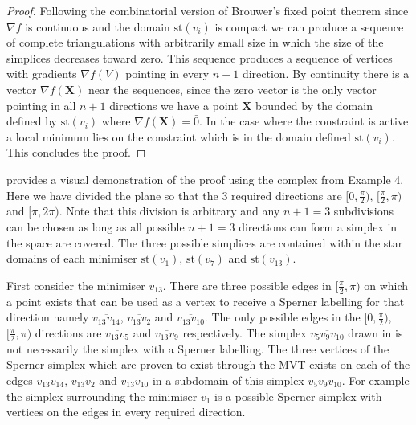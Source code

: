 \begin{proof}
Following the combinatorial version of Brouwer's fixed point theorem \citep{Henle1979} since $\nabla f$ is continuous and the domain $\textrm{st}\left( v_i \right)$ is compact we can produce a sequence of complete triangulations with arbitrarily small size in which the size of the simplices decreases toward zero. This sequence produces a sequence of vertices with gradients $\nabla f(V)$ pointing in every $n+1$ direction. By continuity there is a vector $\nabla f (\mathbf{X})$ near the sequences, since the zero vector is the only vector pointing in all $n+1$ directions we have a point $\mathbf{X}$ bounded by the domain defined by $\textrm{st}\left( v_i \right)$ where $\nabla f (\mathbf{X}) = \bar{0}$.
In the case where the constraint is active a local minimum lies on the constraint which is in the domain defined $\textrm{st}\left( v_i \right)$. This concludes the proof.
\end{proof}

 provides a visual demonstration of the proof using the complex from Example 4. Here we have divided the plane so that the 3 required directions are $[0, \frac{\pi}{2})$, $[\frac{\pi}{2}, \pi)$ and $[\pi, 2 \pi)$. Note that this division is arbitrary and any $n + 1 = 3$ subdivisions can be chosen as long as all possible $n + 1 = 3$ directions can form a simplex in the space are covered. The three possible simplices are contained within the star domains of each minimiser $\textrm{st}\left(v_{1}\right)$, $\textrm{st}\left(v_{7}\right)$ and $\textrm{st}\left(v_{13}\right)$. 

First consider the minimiser $v_{13}$. There are three possible edges in $[\frac{\pi}{2}, \pi)$ on which a point exists that can be used as a vertex to receive a Sperner labelling for that direction namely $\overline{v_{13} v_{14}}$, $\overline{v_{13} v_{2}}$ and $\overline{v_{13}  v_{10}}$. The only possible edges in the $[0, \frac{\pi}{2})$, $[\frac{\pi}{2}, \pi)$ directions are $\overline{v_{13} v_{5}}$ and $\overline{v_{13} v_{9}}$ respectively. The simplex $\overline{v_{5} v_{9} v_{10}}$ drawn in  is not necessarily the simplex with a Sperner labelling. The three vertices of the Sperner simplex which are proven to exist through the MVT exists on each of the edges $\overline{v_{13} v_{14}}$, $\overline{v_{13} v_{2}}$ and $\overline{v_{13}  v_{10}}$ in a subdomain of this simplex $\overline{v_{5} v_{9} v_{10}}$. For example the simplex surrounding the minimiser $v_{1}$ is a possible Sperner simplex with vertices on the edges in every required direction.


